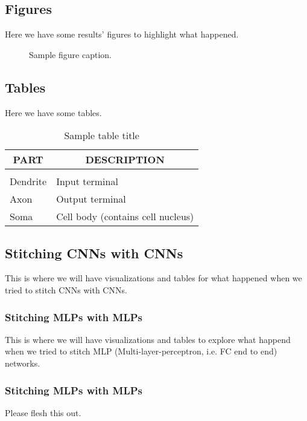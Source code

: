 \documentclass{article} %
\begin{document}
\subsection{Figures}
Here we have some results' figures to highlight what happened.

\begin{figure}[h]
\begin{center}
\fbox{\rule[-.5cm]{0cm}{4cm} \rule[-.5cm]{4cm}{0cm}}
\end{center}
\caption{Sample figure caption.}
\end{figure}

\subsection{Tables}
Here we have some tables.

\begin{table}[h]
\caption{Sample table title}
\label{sample-table}
\begin{center}
\begin{tabular}{ll}
\multicolumn{1}{c}{\bf PART}  &\multicolumn{1}{c}{\bf DESCRIPTION}
\\ \hline \\
Dendrite         &Input terminal \\
Axon             &Output terminal \\
Soma             &Cell body (contains cell nucleus) \\
\end{tabular}
\end{center}
\end{table}

\subsection{Stitching CNNs with CNNs}
This is where we will have visualizations and tables for what happened when
we tried to stitch CNNs with CNNs.

\subsubsection{Stitching MLPs with MLPs}
This is where we will have visualizations and tables to explore what happend
when we tried to stitch MLP (Multi-layer-perceptron, i.e. FC end to end) networks.

\subsubsection{Stitching MLPs with MLPs}
Please flesh this out.
\end{document}
